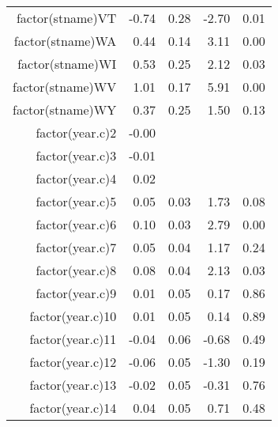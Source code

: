 \begin{table}[ht]
\begin{tabular}{rrrrr}
  factor(stname)VT & -0.74 & 0.28 & -2.70 & 0.01 \\ 
  factor(stname)WA & 0.44 & 0.14 & 3.11 & 0.00 \\ 
  factor(stname)WI & 0.53 & 0.25 & 2.12 & 0.03 \\ 
  factor(stname)WV & 1.01 & 0.17 & 5.91 & 0.00 \\ 
  factor(stname)WY & 0.37 & 0.25 & 1.50 & 0.13 \\ 
  factor(year.c)2 & -0.00 &  &  &  \\ 
  factor(year.c)3 & -0.01 &  &  &  \\ 
  factor(year.c)4 & 0.02 &  &  &  \\ 
  factor(year.c)5 & 0.05 & 0.03 & 1.73 & 0.08 \\ 
  factor(year.c)6 & 0.10 & 0.03 & 2.79 & 0.00 \\ 
  factor(year.c)7 & 0.05 & 0.04 & 1.17 & 0.24 \\ 
  factor(year.c)8 & 0.08 & 0.04 & 2.13 & 0.03 \\ 
  factor(year.c)9 & 0.01 & 0.05 & 0.17 & 0.86 \\ 
  factor(year.c)10 & 0.01 & 0.05 & 0.14 & 0.89 \\ 
  factor(year.c)11 & -0.04 & 0.06 & -0.68 & 0.49 \\ 
  factor(year.c)12 & -0.06 & 0.05 & -1.30 & 0.19 \\ 
  factor(year.c)13 & -0.02 & 0.05 & -0.31 & 0.76 \\ 
  factor(year.c)14 & 0.04 & 0.05 & 0.71 & 0.48 \\ 
   \hline
\end{tabular}
\end{table}
